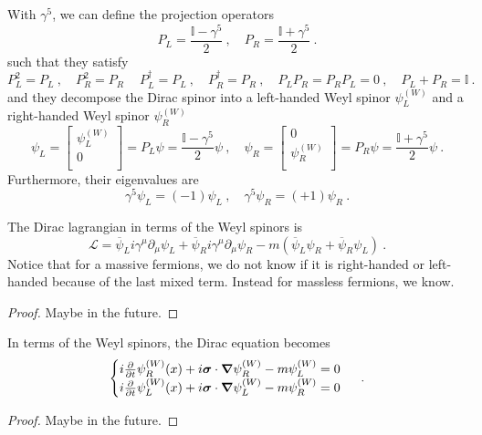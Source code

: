     With $\gamma^5$, we can define the projection operators 
    \begin{equation*}
        P_L = \frac{\mathbb I - \gamma^5}{2} ~, \quad P_R = \frac{\mathbb I + \gamma^5}{2} ~.
    \end{equation*}
    such that they satisfy 
    \begin{equation*}
        P_L^2 = P_L ~, \quad P_R^2 = P_R ~\quad P_L^\dagger = P_L ~, \quad P_R^\dagger = P_R ~, \quad P_L P_R = P_R P_L = 0 ~, \quad P_L + P_R = \mathbb I ~.
    \end{equation*}
    and they decompose the Dirac spinor into a left-handed Weyl spinor $\psi_L^{(W)}$ and a right-handed Weyl spinor $\psi_R^{(W)}$
    \begin{equation*}
        \psi_L = \begin{bmatrix}
            \psi_L^{(W)} \\ 0 \\
        \end{bmatrix} = P_L \psi = \frac{\mathbb I - \gamma^5}{2} \psi ~, \quad \psi_R = \begin{bmatrix}
            0 \\ \psi_R^{(W)} \\
        \end{bmatrix} = P_R \psi = \frac{\mathbb I + \gamma^5}{2} \psi ~.
    \end{equation*}
    Furthermore, their eigenvalues are 
    \begin{equation*}
        \gamma^5 \psi_L = (-1) \psi_L ~, \quad \gamma^5 \psi_R = (+1) \psi_R ~.
    \end{equation*}

    The Dirac lagrangian in terms of the Weyl spinors is 
    \begin{equation*}
        \mathcal L = \overline \psi_L i \gamma^\mu \partial_\mu \psi_L + \overline \psi_R i \gamma^\mu \partial_\mu \psi_R - m (\overline \psi_L \psi_R + \overline \psi_R \psi_L) ~.
    \end{equation*}
    Notice that for a massive fermions, we do not know if it is right-handed or left-handed because of the last mixed term. Instead for massless fermions, we know.
    \begin{proof}
        Maybe in the future.
    \end{proof}

    In terms of the Weyl spinors, the Dirac equation becomes 
    \begin{equation*}
        \begin{cases}
            i \frac{\partial}{\partial t} \psi^{(W)}_R (x) + i \boldsymbol \sigma \cdot \boldsymbol \nabla \psi_R^{(W)} - m \psi_L^{(W)} = 0 \\
            i \frac{\partial}{\partial t} \psi^{(W)}_L (x) + i \boldsymbol \sigma \cdot \boldsymbol \nabla \psi_L^{(W)} - m \psi_R^{(W)} = 0 
        \end{cases} ~.
    \end{equation*}
    \begin{proof}
        Maybe in the future.
    \end{proof}

